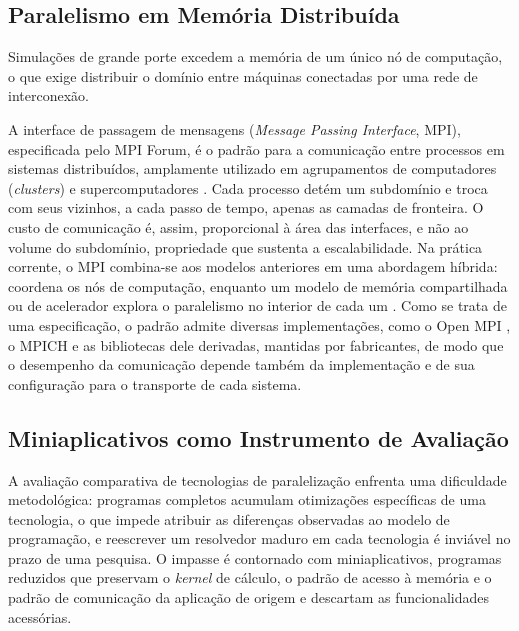 
\subsection{Paralelismo em Memória Distribuída}\label{subsec:paralelismo-distribuido}

Simulações de grande porte excedem a memória de um único nó de computação, o que exige distribuir o domínio entre máquinas conectadas por uma rede de interconexão.

A interface de passagem de mensagens (\textit{Message Passing Interface}, MPI), especificada pelo MPI Forum, é o padrão para a comunicação entre processos em sistemas distribuídos, amplamente utilizado em agrupamentos de computadores (\textit{clusters}) e supercomputadores \parencite{TheMPIForum1993}.
Cada processo detém um subdomínio e troca com seus vizinhos, a cada passo de tempo, apenas as camadas de fronteira.
O custo de comunicação é, assim, proporcional à área das interfaces, e não ao volume do subdomínio, propriedade que sustenta a escalabilidade.
Na prática corrente, o MPI combina-se aos modelos anteriores em uma abordagem híbrida: coordena os nós de computação, enquanto um modelo de memória compartilhada ou de acelerador explora o paralelismo no interior de cada um \parencite{Kolla2018}.
Como se trata de uma especificação, o padrão admite diversas implementações, como o Open MPI \parencite{Gabriel2004}, o MPICH \parencite{Gropp1996} e as bibliotecas dele derivadas, mantidas por fabricantes, de modo que o desempenho da comunicação depende também da implementação e de sua configuração para o transporte de cada sistema.


\subsection{Miniaplicativos como Instrumento de Avaliação}\label{subsec:miniaplicativos}

A avaliação comparativa de tecnologias de paralelização enfrenta uma dificuldade metodológica: programas completos acumulam otimizações específicas de uma tecnologia, o que impede atribuir as diferenças observadas ao modelo de programação, e reescrever um resolvedor maduro em cada tecnologia é inviável no prazo de uma pesquisa.
O impasse é contornado com miniaplicativos, programas reduzidos que preservam o \textit{kernel} de cálculo, o padrão de acesso à memória e o padrão de comunicação da aplicação de origem e descartam as funcionalidades acessórias.


